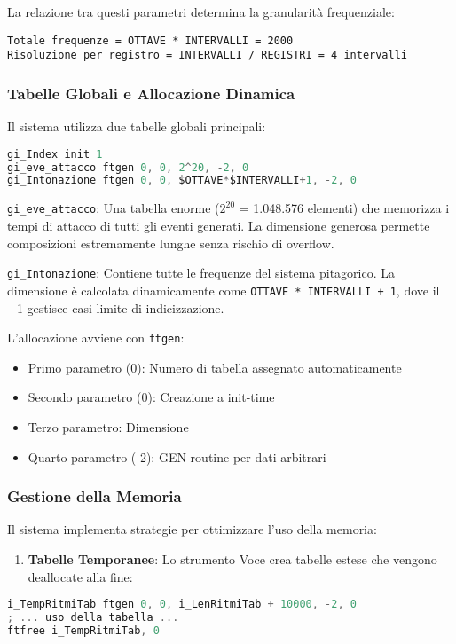 La relazione tra questi parametri determina la granularità frequenziale:
\begin{lstlisting}
Totale frequenze = OTTAVE * INTERVALLI = 2000
Risoluzione per registro = INTERVALLI / REGISTRI = 4 intervalli
\end{lstlisting}
\subsubsection{Tabelle Globali e Allocazione Dinamica}
Il sistema utilizza due tabelle globali principali:

\begin{lstlisting}[language=C]
gi_Index init 1
gi_eve_attacco ftgen 0, 0, 2^20, -2, 0
gi_Intonazione ftgen 0, 0, $OTTAVE*$INTERVALLI+1, -2, 0
\end{lstlisting}

\texttt{gi\_eve\_attacco}: Una tabella enorme ($2^{20}$ = 1.048.576 elementi) che memorizza i tempi di attacco di tutti gli eventi generati. La dimensione generosa permette composizioni estremamente lunghe senza rischio di overflow.

\texttt{gi\_Intonazione}: Contiene tutte le frequenze del sistema pitagorico. La dimensione è calcolata dinamicamente come \texttt{OTTAVE * INTERVALLI + 1}, dove il +1 gestisce casi limite di indicizzazione.

L'allocazione avviene con \texttt{ftgen}:
\begin{itemize}
    \item Primo parametro (0): Numero di tabella assegnato automaticamente
    \item Secondo parametro (0): Creazione a init-time
    \item Terzo parametro: Dimensione
    \item Quarto parametro (-2): GEN routine per dati arbitrari
\end{itemize}
\subsubsection{Gestione della Memoria}
Il sistema implementa strategie per ottimizzare l'uso della memoria:

\begin{enumerate}
    \item \textbf{Tabelle Temporanee}: Lo strumento Voce crea tabelle estese che vengono deallocate alla fine:
\end{enumerate}
\begin{lstlisting}[language=C]
i_TempRitmiTab ftgen 0, 0, i_LenRitmiTab + 10000, -2, 0
; ... uso della tabella ...
ftfree i_TempRitmiTab, 0
\end{lstlisting}

